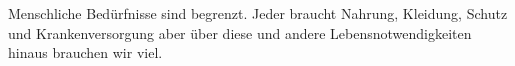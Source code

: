 Menschliche Bedürfnisse sind begrenzt.
Jeder braucht Nahrung, Kleidung, Schutz und Krankenversorgung aber über diese und andere Lebensnotwendigkeiten hinaus brauchen wir viel.
